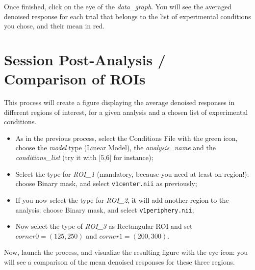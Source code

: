 Once finished, click on the eye of the \textit{data\_graph}. You will see the averaged denoised response for each trial that belongs to the list of experimental conditions you chose, and their mean in red.

\section{Session Post-Analysis / Comparison of ROIs}

This process will create a figure displaying the average denoised responses in different regions of interest, for a given analysis and a chosen list of experimental conditions.

\begin{itemize}
  \item As in the previous process, select the Conditions File with the green icon, choose the \textit{model} type (Linear Model),  the \textit{analysis\_name} and the \textit{conditions\_list} (try it with [5,6] for instance);
  \item Select the type for \textit{ROI\_1} (mandatory, because you need at least on region!): choose Binary mask, and select \texttt{v1center.nii} as previously;
  \item If you now select the type for \textit{ROI\_2}, it will add another region to the analysis: choose Binary mask, and select \texttt{v1periphery.nii};
  \item Now select the type of \textit{ROI\_3} as Rectangular ROI and set $corner0 = (125,250)$ and $corner1 = (200,300)$.
\end{itemize}

Now, launch the process, and visualize the resulting figure with the eye icon: you will see a comparison of the mean denoised responses for these three regions.


